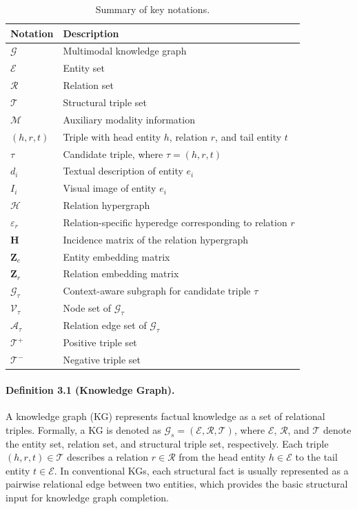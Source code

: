 \documentclass[pdflatex,sn-mathphys-num]{sn-jnl}
\begin{document}
\begin{table}[t]
\centering
\caption{Summary of key notations.}
\label{tab:notations}
\begin{tabular}{ll}
\toprule
\textbf{Notation} & \textbf{Description} \\
\midrule
$\mathcal{G}$ & Multimodal knowledge graph \\
$\mathcal{E}$ & Entity set \\
$\mathcal{R}$ & Relation set \\
$\mathcal{T}$ & Structural triple set \\
$\mathcal{M}$ & Auxiliary modality information \\
$(h,r,t)$ & Triple with head entity $h$, relation $r$, and tail entity $t$ \\
$\tau$ & Candidate triple, where $\tau=(h,r,t)$ \\
$d_i$ & Textual description of entity $e_i$ \\
$I_i$ & Visual image of entity $e_i$ \\
$\mathcal{H}$ & Relation hypergraph \\
$\varepsilon_r$ & Relation-specific hyperedge corresponding to relation $r$ \\
$\mathbf{H}$ & Incidence matrix of the relation hypergraph \\
$\mathbf{Z}_{e}$ & Entity embedding matrix \\
$\mathbf{Z}_{r}$ & Relation embedding matrix \\
$\mathcal{G}_{\tau}$ & Context-aware subgraph for candidate triple $\tau$ \\
$\mathcal{V}_{\tau}$ & Node set of $\mathcal{G}_{\tau}$ \\
$\mathcal{A}_{\tau}$ & Relation edge set of $\mathcal{G}_{\tau}$ \\
$\mathcal{T}^{+}$ & Positive triple set \\
$\mathcal{T}^{-}$ & Negative triple set \\
\bottomrule
\end{tabular}
\end{table}

\paragraph{Definition 3.1 (Knowledge Graph).}
A knowledge graph (KG) represents factual knowledge as a set of relational triples. Formally, a KG is denoted as $\mathcal{G}_{s}=(\mathcal{E},\mathcal{R},\mathcal{T})$, where $\mathcal{E}$, $\mathcal{R}$, and $\mathcal{T}$ denote the entity set, relation set, and structural triple set, respectively. Each triple $(h,r,t)\in\mathcal{T}$ describes a relation $r\in\mathcal{R}$ from the head entity $h\in\mathcal{E}$ to the tail entity $t\in\mathcal{E}$. In conventional KGs, each structural fact is usually represented as a pairwise relational edge between two entities, which provides the basic structural input for knowledge graph completion.
\end{document}
